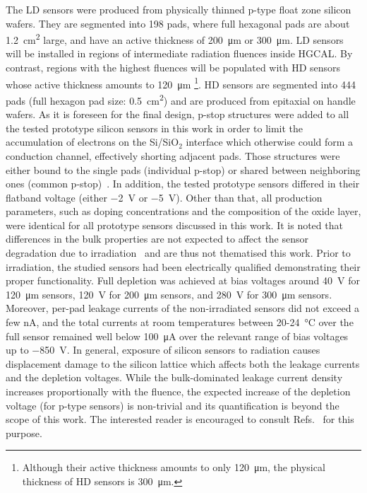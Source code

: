 The LD sensors were produced from physically thinned p-type float zone silicon wafers.
They are segmented into 198 pads, where full hexagonal pads are about \SI{1.2}{\centi\metre\squared} large, and have an active thickness of \SI{200}{\micro\meter} or \SI{300}{\micro\meter}.
LD sensors will be installed in regions of intermediate radiation fluences inside HGCAL.
By contrast, regions with the highest fluences will be populated with HD sensors whose active thickness amounts to \SI{120}{\micro\meter} \footnote{Although their active thickness amounts to only \SI{120}{\micro\meter}, the physical thickness of HD sensors is \SI{300}{\micro\meter}.}.\newline
HD sensors are segmented into 444 pads (full hexagon pad size: \SI{0.5}{\centi\metre\squared}) and are produced from epitaxial on handle wafers.
As it is foreseen for the final design, p-stop structures were added to all the tested prototype silicon sensors in this work in order to limit the accumulation of electrons on the Si/SiO$_2$ interface which otherwise could form a conduction channel, effectively shorting adjacent pads.
Those structures were either bound to the single pads (individual p-stop) or shared between neighboring ones (common p-stop)~\cite{Brondolin_2020}.
In addition, the tested prototype sensors differed in their flatband voltage (either \SI{-2}{\volt} or \SI{-5}{\volt}).
Other than that, all production parameters, such as doping concentrations and the composition of the oxide layer, were identical for all prototype sensors discussed in this work.
It is noted that differences in the bulk properties are not expected to affect the sensor degradation due to irradiation~\cite{MOLL199987} and are thus not thematised this work.
\newline
Prior to irradiation, the studied sensors had been electrically qualified demonstrating their proper functionality.
Full depletion was achieved at bias voltages around \SI{40}{\volt} for \SI{120}{\micro\metre} sensors, \SI{120}{\volt} for \SI{200}{\micro\metre} sensors, and \SI{280}{\volt} for \SI{300}{\micro\meter} sensors. 
Moreover, per-pad leakage currents of the non-irradiated sensors did not exceed a few nA, and the total currents at room temperatures between 20-\SI{24}{\celsius} over the full sensor remained well below \SI{100}{\micro\ampere} over the relevant range of bias voltages up to \SI{-850}{\volt}. \newline
In general, exposure of silicon sensors to radiation causes displacement damage to the silicon lattice which affects both the leakage currents and the depletion voltages. 
While the bulk-dominated leakage current density increases proportionally with the fluence, the expected increase of the depletion voltage (for p-type sensors) is non-trivial and its quantification is beyond the scope of this work.
The interested reader is encouraged to consult Refs.~\cite{moll:SiDamages,LINDSTROM200330} for this purpose.